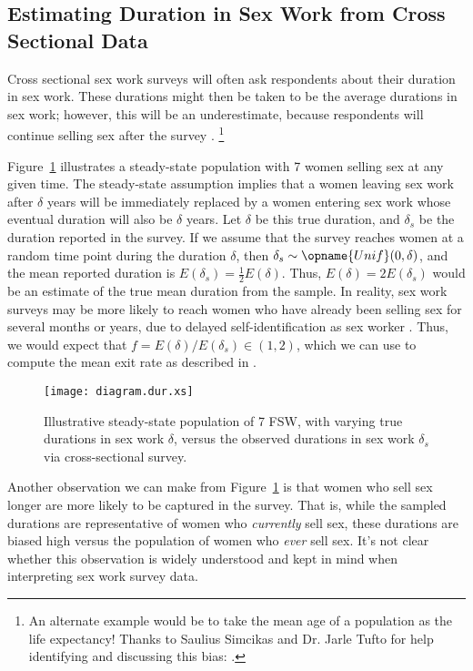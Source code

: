 \subsection{Estimating Duration in Sex Work from Cross Sectional Data}\label{app.math.dur.xs}
Cross sectional sex work surveys will often ask respondents about their duration in sex work.
These durations might then be taken to be the average durations in sex work;
however, this will be an underestimate,
because respondents will continue selling sex after the survey \cite{Fazito2012}.%
\footnote{An alternate example would be
  to take the mean age of a population as the life expectancy!
  Thanks to Saulius Simcikas and Dr. Jarle Tufto
  for help identifying and discussing this bias:
  .}
\par
Figure~\ref{fig:diagram.dur.xs} illustrates a steady-state population
with 7 women selling sex at any given time.
The steady-state assumption implies that a women leaving sex work after $\delta$ years
will be immediately replaced by a women entering sex work
whose eventual duration will also be $\delta$ years.
Let $\delta$ be this true duration, and $\delta_s$ be the duration reported in the survey.
If we assume that the survey reaches women at a random time point during the duration $\delta$,
then $\delta_s \sim \opname{Unif}(0,\delta)$,
and the mean reported duration is $E(\delta_s) = \frac{1}{2}E(\delta)$.
Thus, $E(\delta) = 2 E(\delta_s)$ would be an estimate of the true mean duration from the sample.
In reality, sex work surveys may be more likely to reach
women who have already been selling sex for several months or years,
due to delayed self-identification as sex worker \cite{Cheuk2020}.
Thus, we would expect that $f = E(\delta) / E(\delta_s) \in (1,2)$,
which we can use to compute the mean exit rate as described in .
\begin{figure}[h]
  \centering
  \texttt{[image: diagram.dur.xs]}
  \caption{Illustrative steady-state population of 7 FSW,
    with varying true durations in sex work $\delta$,
    versus the observed durations in sex work $\delta_s$ via cross-sectional survey.}
  \label{fig:diagram.dur.xs}
\end{figure}
\par
Another observation we can make from Figure~\ref{fig:diagram.dur.xs} is that
women who sell sex longer are more likely to be captured in the survey.
That is, while the sampled durations are representative of women who \emph{currently} sell sex,
these durations are biased high versus the population of women who \emph{ever} sell sex.
It's not clear whether this observation is widely understood
and kept in mind when interpreting sex work survey data.
